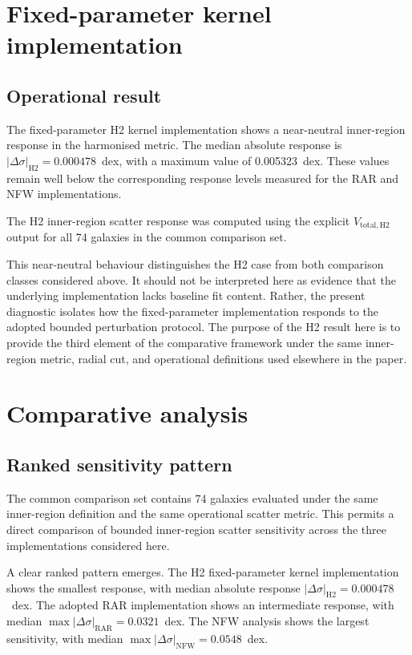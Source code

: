 \documentclass[fleqn,usenatbib]{mnras}
\begin{document}
\section{Fixed-parameter kernel implementation}
\label{sec:h2}

\subsection{Operational result}
\label{subsec:h2_results}

The fixed-parameter H2 kernel implementation shows a near-neutral
inner-region response in the harmonised metric. The median absolute
response is $|\Delta \sigma|_{\mathrm{H2}} = 0.000478$~dex, with a
maximum value of 0.005323~dex. These values remain well below the
corresponding response levels measured for the RAR and NFW
implementations.

The H2 inner-region scatter response was computed using the explicit
$V_{\mathrm{total,H2}}$ output for all 74 galaxies in the common
comparison set.

This near-neutral behaviour distinguishes the H2 case from both
comparison classes considered above. It should not be interpreted here
as evidence that the underlying implementation lacks baseline fit
content. Rather, the present diagnostic isolates how the fixed-parameter
implementation responds to the adopted bounded perturbation protocol.
The purpose of the H2 result here is to provide the third element of
the comparative framework under the same inner-region metric, radial
cut, and operational definitions used elsewhere in the paper.


\section{Comparative analysis}
\label{sec:comparative}

\subsection{Ranked sensitivity pattern}
\label{subsec:ranked_pattern}

The common comparison set contains 74 galaxies evaluated under the same inner-region definition and the same operational scatter metric. This permits a direct comparison of bounded inner-region scatter sensitivity across the three implementations considered here.

A clear ranked pattern emerges. The H2 fixed-parameter kernel implementation shows the smallest response, with median absolute response $|\Delta \sigma|_{\mathrm{H2}} = 0.000478$~dex. The adopted RAR implementation shows an intermediate response, with median $\max |\Delta \sigma|_{\mathrm{RAR}} = 0.0321$~dex. The NFW analysis shows the largest sensitivity, with median $\max |\Delta \sigma|_{\mathrm{NFW}} = 0.0548$~dex.
\end{document}
